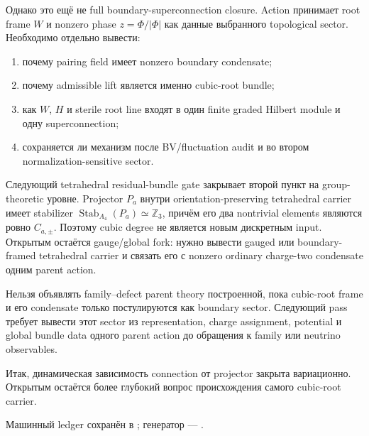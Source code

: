 Однако это ещё не full boundary-superconnection closure. Action принимает
root frame \(W\) и nonzero phase \(z=\Phi/|\Phi|\) как данные выбранного
topological sector. Необходимо отдельно вывести:
\begin{enumerate}
 \item почему pairing field имеет nonzero boundary condensate;
 \item почему admissible lift является именно cubic-root bundle;
 \item как \(W\), \(H\) и sterile root line входят в один finite graded
 Hilbert module и одну superconnection;
 \item сохраняется ли механизм после BV/fluctuation audit и во втором
 normalization-sensitive sector.
\end{enumerate}

Следующий tetrahedral residual-bundle gate закрывает второй пункт на
group-theoretic уровне. Projector \(P_a\) внутри orientation-preserving
tetrahedral carrier имеет stabilizer
\(\operatorname{Stab}_{A_4}(P_a)\simeq\mathbb Z_3\), причём его два
nontrivial elements являются ровно \(C_{a,\pm}\). Поэтому cubic degree не
является новым дискретным input. Открытым остаётся gauge/global fork:
нужно вывести gauged или boundary-framed tetrahedral carrier и связать его
с nonzero ordinary charge-two condensate одним parent action.

\begin{nogocriterion}
Нельзя объявлять family--defect parent theory построенной, пока cubic-root
frame и его condensate только постулируются как boundary sector. Следующий
pass требует вывести этот sector из representation, charge assignment,
potential и global bundle data одного parent action до обращения к family
или neutrino observables.
\end{nogocriterion}

Итак, динамическая зависимость connection от projector закрыта
вариационно. Открытым остаётся более глубокий вопрос происхождения самого
cubic-root carrier.

Машинный ledger сохранён в
; генератор
--- .
